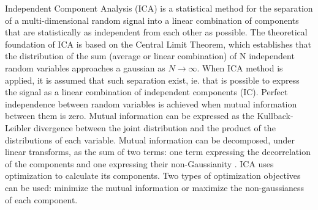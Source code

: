 \documentclass[review]{elsarticle}
\theoremstyle{definition} %
\theoremstyle{remark}
\begin{document}
Independent Component Analysis (ICA)\cite{hyvarinen2000independent} is a statistical method for the separation of a multi-dimensional random signal into a linear combination of components that are statistically as independent from each other as possible. The theoretical foundation of ICA is based on the Central Limit Theorem, which establishes that the distribution of the sum (average or linear combination) of N independent random variables approaches a gaussian as $N \rightarrow \infty$. When ICA method is applied, it is assumed that such separation exist, ie. that is possible to express the signal as a linear combination of independent components (IC). Perfect independence between random variables is achieved when mutual information between them is zero. Mutual information can be expressed as the Kullback-Leibler divergence between the joint distribution and the product of the distributions of each variable. Mutual information can be decomposed, under linear transforms, as the sum of two terms: one term expressing the decorrelation of the components and one expressing their non-Gaussianity \cite{cardoso2003dependence}. ICA uses optimization to calculate its components. Two types of optimization objectives can be used: minimize the mutual information or maximize the non-gaussianess of each component. 

\end{document}
